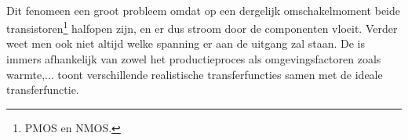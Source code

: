 \paragraph{}
Dit fenomeen een groot probleem omdat op een dergelijk omschakelmoment beide transistoren\footnote{PMOS en NMOS.} halfopen zijn, en er dus stroom door de componenten vloeit. Verder weet men ook niet altijd welke spanning er aan de uitgang zal staan. De  is immers afhankelijk van zowel het productieproces als omgevingsfactoren zoals warmte,...  toont verschillende realistische transferfuncties samen met de ideale transferfunctie.

